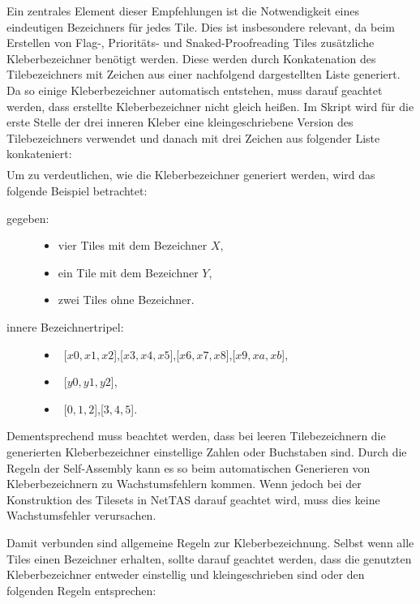 Ein zentrales Element dieser Empfehlungen ist die Notwendigkeit eines eindeutigen Bezeichners für jedes Tile. Dies ist insbesondere relevant, da beim Erstellen von Flag-, Prioritäts- und Snaked-Proofreading Tiles zusätzliche Kleberbezeichner benötigt werden. Diese werden durch Konkatenation des Tilebezeichners mit Zeichen aus einer nachfolgend dargestellten Liste generiert. Da so einige Kleberbezeichner automatisch entstehen, muss darauf geachtet werden, dass erstellte Kleberbezeichner nicht gleich heißen.
Im Skript wird für die erste Stelle der drei inneren Kleber eine kleingeschriebene Version des Tilebezeichners verwendet und danach mit drei Zeichen aus folgender Liste konkateniert:
\begin{align*}
    [0,1,\dots,8,9,a,b,\dots,y,z,aa,ab,\dots,zy,zz]
\end{align*}
Um zu verdeutlichen, wie die Kleberbezeichner generiert werden, wird das folgende Beispiel betrachtet:
\begin{description}
    \item[gegeben:]\hfill 
    \begin{itemize}
        \item vier Tiles mit dem Bezeichner $X$,
        \item ein Tile mit dem Bezeichner $Y$,
        \item zwei Tiles ohne Bezeichner.
    \end{itemize}
    \item[innere Bezeichnertripel:]\hfill
    \begin{itemize}
        \item~[$x0,x1,x2$],[$x3,x4,x5$],[$x6,x7,x8$],[$x9,xa,xb$],
        \item~[$y0,y1,y2$],
        \item~[$0,1,2$],[$3,4,5$].
    \end{itemize}
\end{description}

Dementsprechend muss beachtet werden, dass bei leeren Tilebezeichnern die generierten Kleberbezeichner einstellige Zahlen oder Buchstaben sind. Durch die Regeln der Self-Assembly kann es so beim automatischen Generieren von Kleberbezeichnern zu Wachstumsfehlern kommen. Wenn jedoch bei der Konstruktion des Tilesets in NetTAS darauf geachtet wird, muss dies keine Wachstumsfehler verursachen.

Damit verbunden sind allgemeine Regeln zur Kleberbezeichnung. Selbst wenn alle Tiles einen Bezeichner erhalten, sollte darauf geachtet werden, dass die genutzten Kleberbezeichner entweder einstellig und kleingeschrieben sind oder den folgenden Regeln entsprechen:

